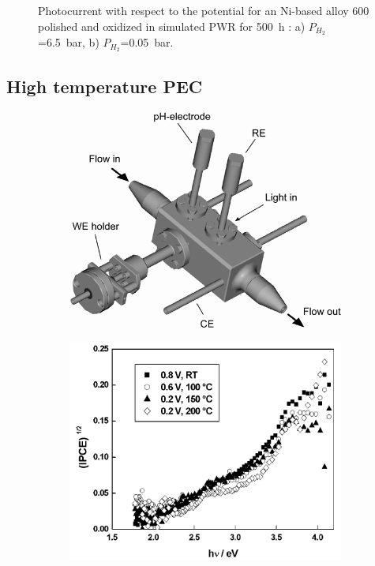 \begin{figure}[h]
        \caption{Photocurrent with respect to the potential for an 
        Ni-based alloy 600 polished and oxidized in simulated PWR 
        for 500~h \citep{loucif2013}: a) $P_{H_2}$=6.5~bar, b) $P_{H_2}$=0.05~bar.}
        \label{fig:loucif_sctype}
    \end{figure}



\subsection{High temperature PEC}


    \renewcommand{\coef}{0.45}
    \begin{figure}[h]
        \centering
        \begin{subfigure}{\coef\textwidth}
            \centering
            \includegraphics[width=\textwidth]{./src/figures/Bojinov_2002_Fig1.png}
            \caption{}
            \label{fig:bojinov_ht_a}
        \end{subfigure}
        \begin{subfigure}{\coef\textwidth}
            \centering
            \includegraphics[width=\textwidth]{./src/figures/Bojinov_2002_Fig5b.png}

\end{subfigure}
\end{figure}
